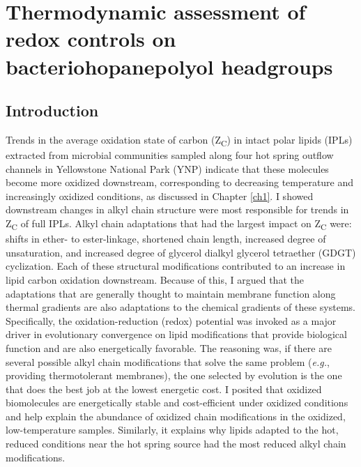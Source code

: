 \chapter[THERMODYNAMIC ASSESSMENT OF REDOX CONTROLS ON BACTERIOHOPANEPOLYOL HEADGROUPS]{Thermodynamic assessment of redox controls on bacteriohopanepolyol headgroups}\label{ch3}


\section{Introduction}

Trends in the average oxidation state of carbon (Z\textsubscript{C}) in intact polar lipids (IPLs) extracted from microbial communities sampled along four hot spring outflow channels in Yellowstone National Park (YNP) indicate that these molecules become more oxidized downstream, corresponding to decreasing temperature and increasingly oxidized conditions, as discussed in Chapter \ref{ch1}. I showed downstream changes in alkyl chain structure were most responsible for trends in Z\textsubscript{C} of full IPLs. Alkyl chain adaptations that had the largest impact on Z\textsubscript{C} were: shifts in ether- to ester-linkage, shortened chain length, increased degree of unsaturation, and increased degree of glycerol dialkyl glycerol tetraether (GDGT) cyclization. Each of these structural modifications contributed to an increase in lipid carbon oxidation downstream. Because of this, I argued that the adaptations that are generally thought to maintain membrane function along thermal gradients are also adaptations to the chemical gradients of these systems. Specifically, the oxidation-reduction (redox) potential was invoked as a major driver in evolutionary convergence on lipid modifications that provide biological function and are also energetically favorable. The reasoning was, if there are several possible alkyl chain modifications that solve the same problem (\textit{e.g.}, providing thermotolerant membranes), the one selected by evolution is the one that does the best job at the lowest energetic cost. I posited that oxidized biomolecules are energetically stable and cost-efficient under oxidized conditions and help explain the abundance of oxidized chain modifications in the oxidized, low-temperature samples. Similarly, it explains why lipids adapted to the hot, reduced conditions near the hot spring source had the most reduced alkyl chain modifications.

